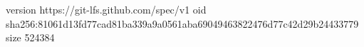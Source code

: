 version https://git-lfs.github.com/spec/v1
oid sha256:81061d13fd77cad81ba339a9a0561aba69049463822476d77c42d29b24433779
size 524384
